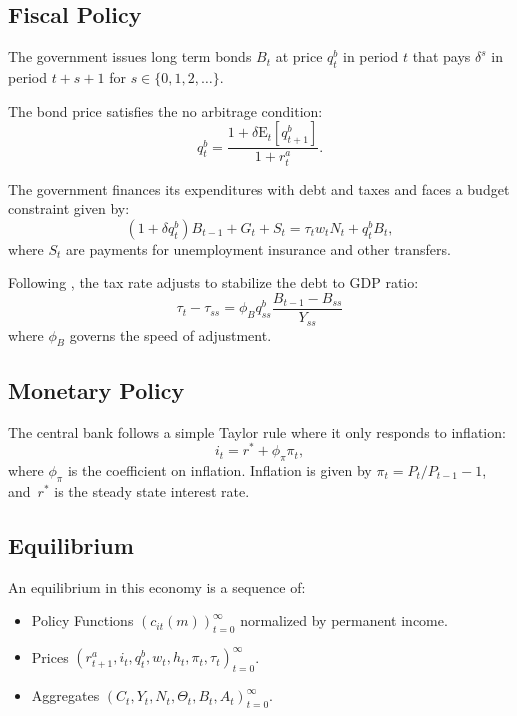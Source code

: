 \documentclass[\econtexRoot/HAFiscal]{subfiles}
\begin{document}
\subsection{Fiscal Policy}

The government issues long term bonds $B_{t}$ at price $q^{b}_{t}$ in period $t$ that pays $\delta^{s}$ in period $t+s+1$ for $s \in \{0,1,2,\ldots\}$.

The bond price satisfies the no arbitrage condition:
$$q^{b}_{t} = \frac{ 1  + \delta \mathrm{E}_{t}[q^{b}_{t+1}]}{1+r^{a}_{t}}.$$ 

The government finances its expenditures with debt and taxes and faces a budget constraint given by: 
$$ (1 + \delta q^{b}_{t})B_{t-1} + G_{t}  + S_{t} = \tau_{t} w_{t} N_{t}+ q^{b}_{t}B_{t},$$
where $S_{t}$ are payments for unemployment insurance and other transfers.

Following \cite{Auclert2020}, the tax rate adjusts to stabilize the debt to GDP ratio:
$$\tau_{t} - \tau_{ss} = \phi_{B} q^{b}_{ss} \frac{B_{t-1} - B_{ss} }{Y_{ss}}$$
where $\phi_{B}$ governs the speed of adjustment. 

\subsection{Monetary Policy}

The central bank follows a simple Taylor rule where it only responds to inflation: 
$$i_{t} = r^{*} +\phi_{\pi} \pi_{t},$$ 
where $\phi_{\pi}$ is the coefficient on inflation. Inflation is given by $\pi_t = P_t/P_{t-1}-1$, and~$r^{*}$ is the steady state interest rate. 

\subsection{Equilibrium}

An equilibrium in this economy is a sequence of: 
\begin{itemize}[label=--]
	\item Policy Functions $\left( c_{it}(m) \right )_{t=0}^{\infty}$ normalized by permanent income.
	\item Prices $ \left( r^{a}_{t+1}, i_{t}, q^{b}_{t},  w_{t}, h_{t} , \pi_{t} , \tau_{t} \right) _{t=0}^{\infty}$.
	\item Aggregates $ \left(C_{t}, Y_{t} , N_{t},   \Theta_{t},  B_{t} , A_{t}  \right)_{t=0}^{\infty}$.
\end{itemize}
\end{document}
